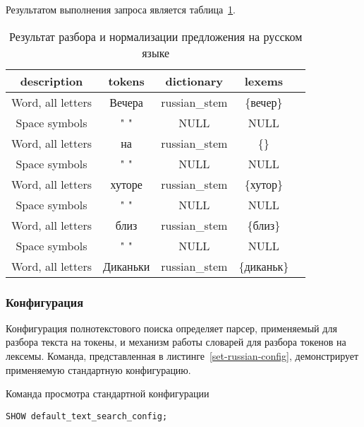 \noindent Результатом выполнения запроса является таблица~\ref{parse-and-normalize}.

\begin{table}
    \centering
    \begin{tabular}{|c|c|c|c|c|}
        \hline
        \textbf{description} & \textbf{tokens} & \textbf{dictionary} & \textbf{lexems} \\ \hline
        Word, all letters      & Вечера        & russian\_stem & \{вечер\}    \\ \hline
        Space symbols          & " "           & NULL          & NULL         \\ \hline
        Word, all letters      & на            & russian\_stem & \{\}         \\ \hline
        Space symbols          & " "           & NULL          & NULL         \\ \hline
        Word, all letters      & хуторе        & russian\_stem & \{хутор\}    \\ \hline
        Space symbols          & " "           & NULL          & NULL         \\ \hline
        Word, all letters      & близ          & russian\_stem & \{близ\}     \\ \hline
        Space symbols          & " "           & NULL          & NULL         \\ \hline
        Word, all letters      & Диканьки      & russian\_stem & \{диканьк\}  \\ \hline
    \end{tabular}
    \caption{Результат разбора и нормализации предложения на русском языке}
    \label{parse-and-normalize}
\end{table}

\subsubsection{Конфигурация}

Конфигурация полнотекстового поиска определяет парсер, применяемый для разбора текста на токены, и механизм работы словарей для разбора токенов на лексемы.
Команда, представленная в листинге~\ref{set-russian-config}, демонстрирует применяемую стандартную конфигурацию.

\begin{algorithm}
    \caption{Команда просмотра стандартной конфигурации}
    \label{set-russian-config}
    \begin{lstlisting}[style=codelistingstyle]
    SHOW default_text_search_config;
    \end{lstlisting}
\end{algorithm}

